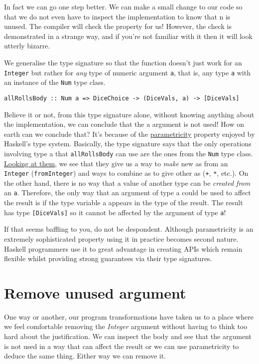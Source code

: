 In fact we can go one step better. We can make a small change to our code so that we do not even have to inspect the implementation to know that n is unused. The compiler will check the property for us! However, the check is demonstrated in a strange way, and if you're not familiar with it then it will look utterly bizarre.

We generalise the type signature so that the function doesn't just work for an \texttt{Integer} but rather for \textit{any} type of numeric argument \texttt{a}, that is, any type \texttt{a} with an instance of the \texttt{Num} type class.

\begin{verbatim}
allRollsBody :: Num a => DiceChoice -> (DiceVals, a) -> [DiceVals]
\end{verbatim}
Believe it or not, from this type signature alone, without knowing anything about the implementation, we can conclude that the a argument is not used! How on earth can we conclude that? It's because of the \href{https://en.wikipedia.org/wiki/Parametricity}{parametricity} property enjoyed by Haskell's type system. Basically, the type signature says that the only operations involving type a that \texttt{allRollsBody} can use are the ones from the \texttt{Num} type class. \href{https://www.stackage.org/haddock/lts-13.21/base-4.12.0.0/Prelude.html#t:Num}{Looking at them}, we see that they give us a way to \textit{make} new as from an \texttt{Integer} (\texttt{fromInteger}) and ways to combine as to give other as (\texttt{+}, \texttt{*}, etc.). On the other hand, there is no way that a value of another type can be \textit{created from} an \texttt{a}. Therefore, the only way that an argument of type a could be used to affect the result is if the type variable a appears in the type of the result. The result has type \texttt{[DiceVals]} so it cannot be affected by the argument of type \texttt{a}!

If that seems baffling to you, do not be despondent. Although parametricity is an extremely sophisticated property using it in practice becomes second nature. Haskell programmers use it to great advantage in creating APIs which remain flexible whilst providing strong guarantees via their type signatures.

\section{Remove unused argument}


One way or another, our program transformations have taken us to a place where we feel comfortable removing the \textit{Integer} argument without having to think too hard about the justification. We can inspect the body and see that the argument is not used in a way that can affect the result or we can use parametricity to deduce the same thing. Either way we can remove it.

